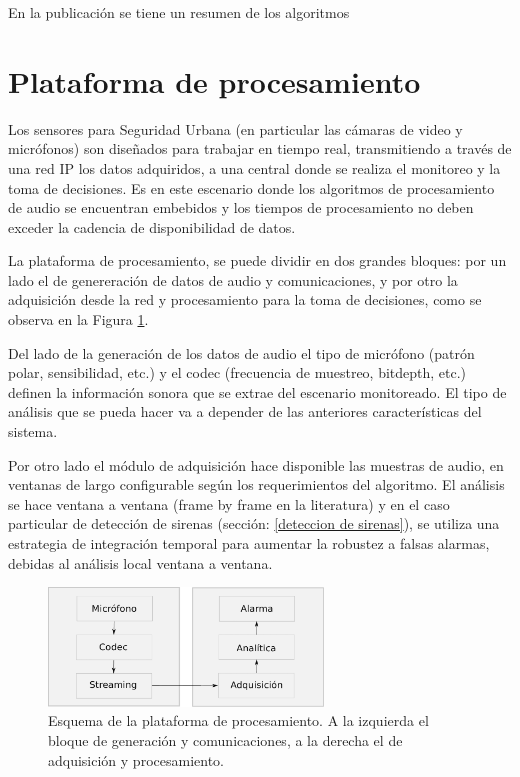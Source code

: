 \documentclass{article}
\begin{document}
\bigskip
En la publicación \cite{crocco2014audio} se tiene un resumen de los algoritmos  



\section{Plataforma de procesamiento}
\label{PP}
Los sensores para Seguridad Urbana (en particular las cámaras de video y micrófonos) son diseñados para trabajar en tiempo real, transmitiendo a través de una red IP los datos adquiridos, a una central donde se realiza el monitoreo y la toma de decisiones. Es en este escenario donde los algoritmos de procesamiento de audio se encuentran embebidos y los tiempos de procesamiento no deben exceder la cadencia de disponibilidad de datos.

\bigskip
La plataforma de procesamiento, se puede dividir en dos grandes bloques: por un lado el de genereración de datos de audio y comunicaciones, y por otro la adquisición desde la red y procesamiento para la toma de decisiones, como se observa en la Figura \ref{fig:plataforma_procesamiento}.
\bigskip

Del lado de la generación de los datos de audio el tipo de micrófono (patrón polar, sensibilidad, etc.) y el codec (frecuencia de muestreo, bitdepth, etc.) definen la información sonora que se extrae del escenario monitoreado. El tipo de análisis que se pueda hacer va a depender de las anteriores características del sistema.
\bigskip

Por otro lado el módulo de adquisición hace disponible las muestras de audio, en ventanas de largo configurable según los requerimientos del algoritmo. El análisis se hace ventana a ventana (frame by frame en la literatura) y en el caso particular de detección de sirenas (sección: \ref{deteccion de sirenas}), se utiliza una estrategia de integración temporal para aumentar la robustez a falsas alarmas, debidas al análisis local ventana a ventana.


\begin{figure}[h]
\begin{center}
\includegraphics[width=0.65\textwidth]{plataforma_procesamiento} 
\caption{Esquema de la plataforma de procesamiento. A la izquierda el bloque de generación y comunicaciones, a la derecha el de adquisición y procesamiento.}
\label{fig:plataforma_procesamiento}
\end{center}
\end{figure}
\end{document}
